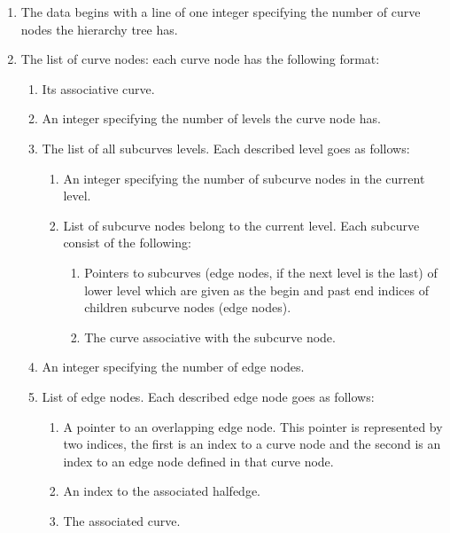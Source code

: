\begin{ccAdvanced}
\begin{enumerate}
    \item The data begins with a line of one integer specifying the number 
    of curve nodes the hierarchy tree has.
    \item The list of curve nodes: 
    each curve node has the following format:
    \begin{enumerate}
        \item Its associative curve.
        \item An integer specifying the number of levels the curve node has.
        \item The list of all subcurves levels. Each described level goes as follows:
        \begin{enumerate}
            \item An integer specifying the number of subcurve nodes in the current level.
            \item List of subcurve nodes belong to the current level. 
            Each subcurve consist of the following:
            \begin{enumerate}
                \item Pointers to subcurves (edge nodes, if the next level is the last) 
                of lower level which are given as the begin and past end indices 
                of children subcurve nodes (edge nodes).
                \item The curve associative with the subcurve node.
            \end{enumerate}
        \end{enumerate}
        \item An integer specifying the number of edge nodes.
        \item List of edge nodes. Each described edge node goes as follows:
        \begin{enumerate}
            \item A pointer to an overlapping edge node.
            This pointer is represented by two indices, the first is an index to a curve node 
            and the second is an index to an edge node defined in that curve node.
            \item An index to the associated halfedge.
            \item The associated curve.
        \end{enumerate}    
    \end{enumerate}
\end{enumerate}


\end{ccAdvanced}
